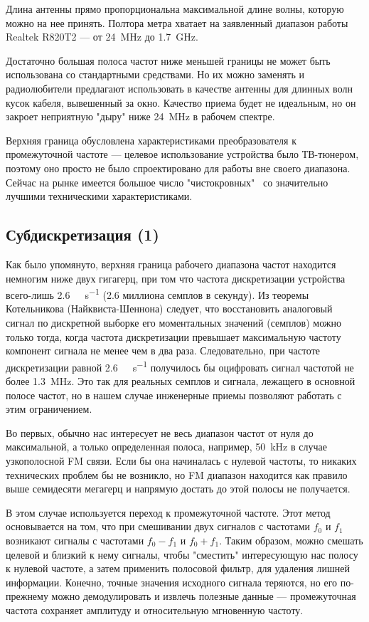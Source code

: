Длина антенны прямо пропорциональна максимальной длине волны, которую можно на нее принять. Полтора метра хватает на заявленный диапазон работы Realtek R820T2 --- от \SI{24}{\mega\hertz} до \SI{1.7}{\giga\hertz}.

Достаточно большая полоса частот ниже меньшей границы не может быть использована со стандартными средствами. Но их можно заменять и радиолюбители предлагают использовать в качестве антенны для длинных волн кусок кабеля, вывешенный за окно. Качество приема будет не идеальным, но он закроет неприятную "дыру" ниже \SI{24}{\mega\hertz} в рабочем спектре.

Верхняя граница обусловлена характеристиками преобразователя к промежуточной частоте --- целевое использование устройства было ТВ-тюнером, поэтому оно просто не было спроектировано для работы вне своего диапазона. Сейчас на рынке имеется большое число "чистокровных" \SDR\ со значительно лучшими техническими характеристиками.


\subsection{Субдискретизация (1)}

Как было упомянуто, верхняя граница рабочего диапазона частот находится немногим ниже двух гигагерц, при том что частота дискретизации устройства всего-лишь \SI{2.6}{\mega\sample\per\second} (\num{2.6} миллиона семплов в секунду). Из теоремы Котельникова (Найквиста-Шеннона) следует, что восстановить аналоговый сигнал по дискретной выборке его моментальных значений (семплов) можно только тогда, когда частота дискретизации превышает максимальную частоту компонент сигнала не менее чем в два раза. Следовательно, при частоте дискретизации равной \SI{2.6}{\mega\sample\per\second} получилось бы оцифровать сигнал частотой не более \SI{1.3}{\mega\hertz}. Это так для реальных семплов и сигнала, лежащего в основной полосе частот, но в нашем случае инженерные приемы позволяют работать с этим ограничением.

Во первых, обычно нас интересует не весь диапазон частот от нуля до максимальной, а только определенная полоса, например, \SI{50}{\kilo\hertz} в случае узкополосной FM связи. Если бы она начиналась с нулевой частоты, то никаких технических проблем бы не возникло, но FM диапазон находится как правило выше семидесяти мегагерц и напрямую достать до этой полосы не получается.

В этом случае используется переход к промежуточной частоте. Этот метод основывается на том, что при смешивании двух сигналов с частотами $f_0$ и $f_1$ возникают сигналы с частотами $f_0 - f_1$ и $f_0 + f_1$. Таким образом, можно смешать целевой и близкий к нему сигналы, чтобы "сместить" интересующую нас полосу к нулевой частоте, а затем применить полосовой фильтр, для удаления лишней информации. Конечно, точные значения исходного сигнала теряются, но его по-прежнему можно демодулировать и извлечь полезные данные --- промежуточная частота сохраняет амплитуду и относительную мгновенную частоту.

